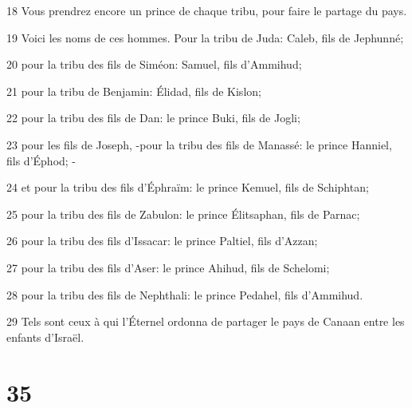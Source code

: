 \par 18 Vous prendrez encore un prince de chaque tribu, pour faire le partage du pays.
\par 19 Voici les noms de ces hommes. Pour la tribu de Juda: Caleb, fils de Jephunné;
\par 20 pour la tribu des fils de Siméon: Samuel, fils d'Ammihud;
\par 21 pour la tribu de Benjamin: Élidad, fils de Kislon;
\par 22 pour la tribu des fils de Dan: le prince Buki, fils de Jogli;
\par 23 pour les fils de Joseph, -pour la tribu des fils de Manassé: le prince Hanniel, fils d'Éphod; -
\par 24 et pour la tribu des fils d'Éphraïm: le prince Kemuel, fils de Schiphtan;
\par 25 pour la tribu des fils de Zabulon: le prince Élitsaphan, fils de Parnac;
\par 26 pour la tribu des fils d'Issacar: le prince Paltiel, fils d'Azzan;
\par 27 pour la tribu des fils d'Aser: le prince Ahihud, fils de Schelomi;
\par 28 pour la tribu des fils de Nephthali: le prince Pedahel, fils d'Ammihud.
\par 29 Tels sont ceux à qui l'Éternel ordonna de partager le pays de Canaan entre les enfants d'Israël.

\chapter{35}

